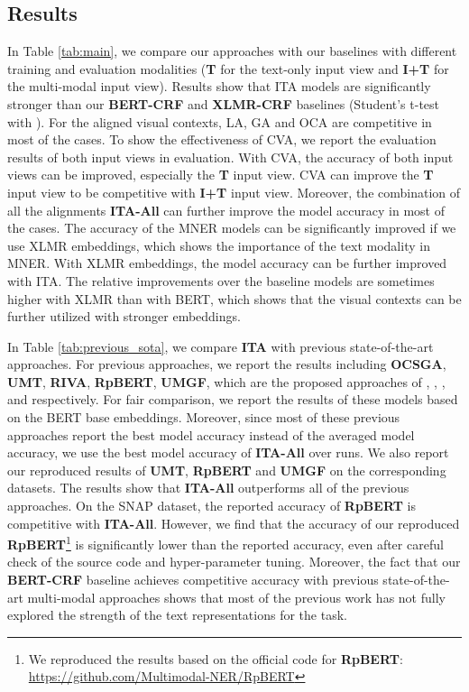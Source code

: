 \documentclass[11pt]{article}
\begin{document}
\subsection{Results}
In Table \ref{tab:main}, we compare our approaches with our baselines with different training and evaluation modalities (\textbf{T} for the text-only input view and \textbf{I+T} for the multi-modal input view). Results show that ITA models are significantly stronger than our {\textbf{BERT-CRF}} and {\textbf{XLMR-CRF}} baselines (Student's t-test with ). For the aligned visual contexts, LA, GA and OCA are competitive in most of the cases. To show the effectiveness of CVA, we report the evaluation results of both input views in evaluation. With CVA, the accuracy of both input views can be improved, especially the \textbf{T} input view. CVA can improve the \textbf{T} input view to be competitive with \textbf{I+T} input view. Moreover, the combination of all the alignments \textbf{ITA-All} can further improve the model accuracy in most of the cases. The accuracy of the MNER models can be significantly improved if we use XLMR embeddings, which shows the importance of the text modality in MNER. With XLMR embeddings, the model accuracy can be further improved with ITA. The relative improvements over the baseline models are sometimes higher with XLMR than with BERT, which shows that the visual contexts can be further utilized with stronger embeddings. 

In Table \ref{tab:previous_sota}, we compare \textbf{ITA} with previous state-of-the-art approaches. For previous approaches, we report the results including
\textbf{OCSGA}, \textbf{UMT}, \textbf{RIVA}, \textbf{RpBERT}, \textbf{UMGF}, which are the proposed approaches of \citet{10.1145/3394171.3413650}, \citet{yu-etal-2020-improving-multimodal}, \citet{sun-etal-2020-riva}, \citet{Sun2021RpBERTAT} and \citet{zhang2021multi} respectively. For fair comparison, we report the results of these models based on the BERT base embeddings. Moreover, since most of these previous approaches report the best model accuracy instead of the averaged model accuracy, we use the best model accuracy of \textbf{ITA-All} over  runs. We also report our reproduced results of \textbf{UMT}, {\textbf{RpBERT}} and \textbf{UMGF} on the corresponding datasets. The results show that \textbf{ITA-All} outperforms all of the previous approaches. On the SNAP dataset, the reported accuracy of {\textbf{RpBERT}} is competitive with \textbf{ITA-All}. However, we find that the accuracy of our reproduced {\textbf{RpBERT}}\footnote{We reproduced the results based on the official code for {\textbf{RpBERT}}: \url{https://github.com/Multimodal-NER/RpBERT}} is significantly lower than the reported accuracy, even after careful check of the source code and hyper-parameter tuning.
Moreover, the fact that our \textbf{BERT-CRF} baseline achieves competitive accuracy with previous state-of-the-art multi-modal approaches shows that most of the previous work has not fully explored the strength of the text representations for the task. 
\end{document}
